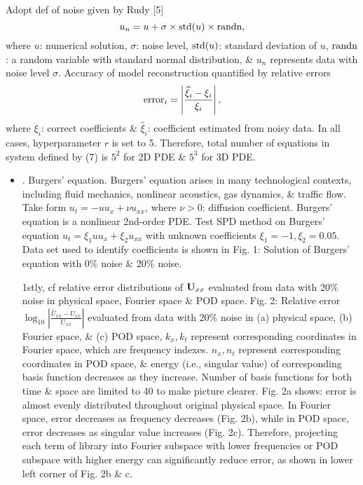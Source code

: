 \documentclass{article}
\begin{document}
\begin{itemize}
	Adopt def of noise given by Rudy [5]
	\begin{equation}
		u_n = u + \sigma\times{\rm std}(u)\times{\rm randn},
	\end{equation}
	where $u$: numerical solution, $\sigma$: noise level, ${\rm std}(u)$: standard deviation of $u$, ${\rm randn}$: a random variable with standard normal distribution, \& $u_n$ represents data with noise level $\sigma$. Accuracy of model reconstruction quantified by relative errors
	\begin{equation}
		{\rm error}_i = \left|\frac{\widehat{\xi}_i - \xi_i}{\xi_i}\right|,
	\end{equation}
	where $\xi_i$: correct coefficients \& $\widehat{\xi}_i$: coefficient estimated from noisy data. In all cases, hyperparameter $r$ is set to 5. Therefore, total number of equations in system defined by (7) is $5^2$ for 2D PDE \& $5^3$ for 3D PDE.
	\begin{itemize}
		\item {. Burgers' equation.} Burgers' equation arises in many technological contexts, including fluid mechanics, nonlinear acoustics, gas dynamics, \& traffic flow. Take form $u_t = -uu_x + \nu u_{xx}$, where $\nu > 0$: diffusion coefficient. Burgers' equation is a nonlinear 2nd-order PDE. Test SPD method on Burgers' equation $u_t = \xi_1uu_x + \xi_2u_{xx}$ with unknown coefficients $\xi_1 = -1,\xi_2 = 0.05$. Data set used to identify coefficients is shown in {\sf Fig. 1: Solution of Burgers' equation with 0\% noise \& 20\% noise}.
		
		1stly, cf relative error distributions of ${\bf U}_{xx}$ evaluated from data with 20\% noise in physical space, Fourier space \& POD space. {\sf Fig. 2: Relative error $\log_{10}\left|\frac{\hat{U}_{xx} - U_{xx}}{U_{xx}}\right|$ evaluated from data with 20\% noise in (a) physical space, (b) Fourier space, \& (c) POD space, $k_x,k_t$ represent corresponding coordinates in Fourier space, which are frequency indexes. $n_x,n_t$ represent corresponding coordinates in POD space, \& energy (i.e., singular value) of corresponding basis function decreases as they increase. Number of basis functions for both time \& space are limited to 40 to make picture clearer.} Fig. 2a shows: error is almost evenly distributed throughout original physical space. In Fourier space, error decreases as frequency decreases (Fig. 2b), while in POD space, error decreases as singular value increases (Fig. 2c). Therefore, projecting each term of library into Fourier subspace with lower frequencies or POD subspace with higher energy can significantly reduce error, as shown in lower left corner of Fig. 2b \& c.
		

\end{itemize}
\end{itemize}
\end{document}
